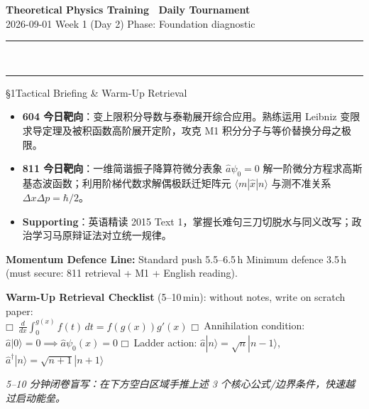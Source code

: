 \documentclass[a4paper,11pt]{article}
\newcommand{\checkbox}{\ensuremath{\mdlgwhtsquare}}
\begin{document}
\begin{center}
  {\LARGE\bfseries\color{navy} Theoretical Physics Training \textperiodcentered\ Daily Tournament}\\[4pt]
  {\small\sffamily\color{mist} 2026-09-01 \quad\textbar\quad Week 1 (Day 2) \quad\textbar\quad Phase: Foundation diagnostic}\\[-3pt]
  {\color{navy}\rule{\textwidth}{0.8pt}}\\[-11pt]
  {\color{border}\rule{\textwidth}{0.3pt}}
\end{center}

\vspace{-4pt}

\begin{briefing}{\S 1\quad Tactical Briefing \& Warm-Up Retrieval}
\begin{itemize}[leftmargin=1.5em, itemsep=2pt, topsep=2pt]
  \item \textbf{604 今日靶向}：变上限积分导数与泰勒展开综合应用。熟练运用 Leibniz 变限求导定理及被积函数高阶展开定阶，攻克 M1 积分分子与等价替换分母之极限。
  \item \textbf{811 今日靶向}：一维简谐振子降算符微分表象 $\hat{a}\psi_0=0$ 解一阶微分方程求高斯基态波函数；利用阶梯代数求解偶极跃迁矩阵元 $\langle m|\hat{x}|n\rangle$ 与测不准关系 $\Delta x \Delta p = \hbar/2$。
  \item \textbf{Supporting}：英语精读 2015 Text 1，掌握长难句三刀切脱水与同义改写；政治学习马原辩证法对立统一规律。
\end{itemize}

\begin{notebox}
\textbf{Momentum Defence Line:} Standard push 5.5--6.5\,h \quad\textbar\quad Minimum defence 3.5\,h (must secure: 811 retrieval + M1 + English reading).
\end{notebox}

\vspace{1mm}
\textbf{Warm-Up Retrieval Checklist} (5--10\,min): without notes, write on scratch paper:\\
\checkbox\ $\frac{d}{dx}\int_0^{g(x)} f(t)\,dt = f(g(x))g'(x)$ \quad
\checkbox\ Annihilation condition: $\hat{a}|0\rangle = 0 \implies \hat{a}\psi_0(x)=0$ \quad
\checkbox\ Ladder action: $\hat{a}|n\rangle=\sqrt{n}|n-1\rangle$, $\hat{a}^\dagger|n\rangle=\sqrt{n+1}|n+1\rangle$
\end{briefing}

\vspace{6pt}

\begin{tcolorbox}[
  enhanced, colback=white, colframe=border, boxrule=0.6pt, arc=2mm,
  left=4mm, right=4mm, top=3mm, bottom=3mm,
  fonttitle=\sffamily\bfseries\color{slate},
  title={\raisebox{0pt}{\color{royal}\rule{3pt}{10pt}}\hspace{4pt}Warm-Up Retrieval Workspace \textbar\ 白纸破冰草稿区},
  colbacktitle=paper, coltitle=slate,
  titlerule=0pt, toptitle=2mm, bottomtitle=2mm
]
\textcolor{mist}{\footnotesize\itshape 5--10 分钟闭卷盲写：在下方空白区域手推上述 3 个核心公式/边界条件，快速越过启动能垒。}
\vspace{9.2cm}
\end{tcolorbox}
\end{document}
